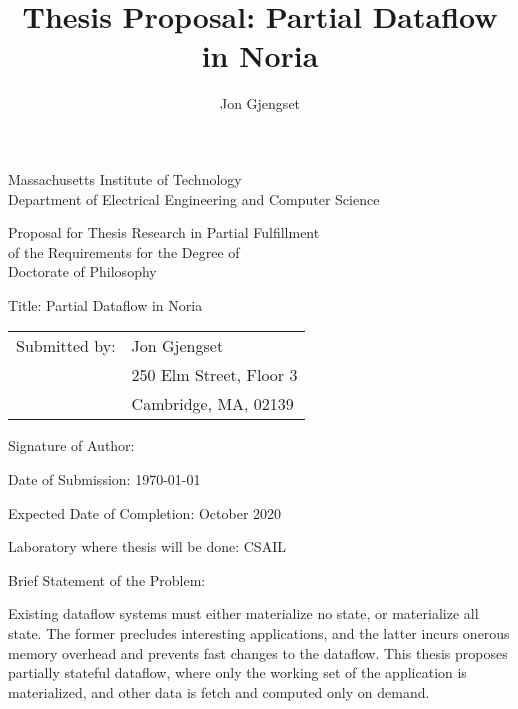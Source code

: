 \documentclass[fontsize=12pt,paper=letter]{scrartcl}
\title{Thesis Proposal: Partial Dataflow in Noria}
\author{Jon Gjengset}
\begin{document}
\begin{spacing}{1}
  \begin{titlepage}
    \begin{center}
      Massachusetts Institute of Technology\\
      Department of Electrical Engineering and Computer Science%
    \end{center}

    \begin{center}
      Proposal for Thesis Research in Partial Fulfillment\\
      of the Requirements for the Degree of\\
      Doctorate of Philosophy%
    \end{center}

    \begin{flushleft}
    Title: Partial Dataflow in Noria

    \vspace{\baselineskip}
    \begin{tabular}{@{}ll}
      Submitted by: & Jon Gjengset\\
      &250 Elm Street, Floor 3\\
      &Cambridge, MA, 02139\\
    \end{tabular}

    \vspace{\baselineskip}
    Signature of Author: \makebox[2.5in]{\hrulefill}

    \vspace{\baselineskip}
    Date of Submission: \today

    \vspace{\baselineskip}
    Expected Date of Completion: October 2020

    \vspace{\baselineskip}
    Laboratory where thesis will be done: CSAIL

    \vspace{\baselineskip}
    Brief Statement of the Problem:
    \end{flushleft}

    \noindent
    Existing dataflow systems must either materialize no state, or materialize
    all state. The former precludes interesting applications, and the latter
    incurs onerous memory overhead and prevents fast changes to the dataflow.
    This thesis proposes partially stateful dataflow, where only the working set
    of the application is materialized, and other data is fetch and computed
    only on demand.
  \end{titlepage}
\end{spacing}
\end{document}
